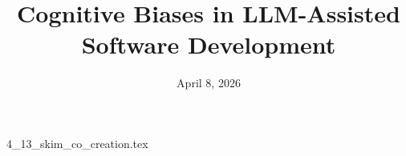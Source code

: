 \documentclass{article}      %
\title{Cognitive Biases in LLM-Assisted Software Development}  %
\date{April 8, 2026}
\begin{document}

\maketitle                   %



{4_13_skim_co_creation.tex}
\printbibliography
\end{document}
